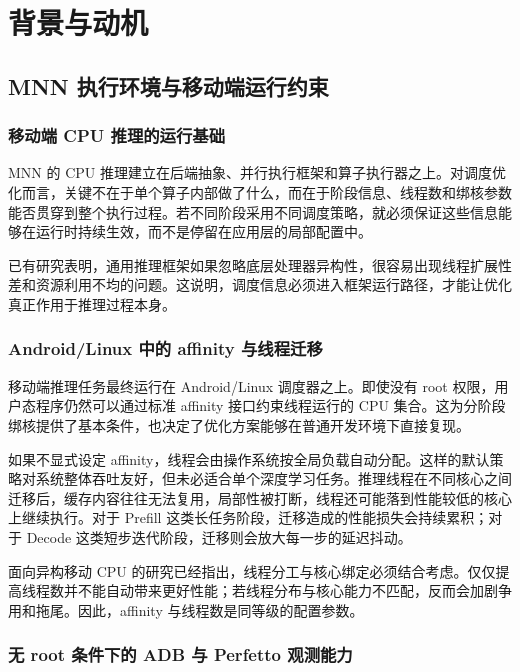 \chapter{背景与动机}

\section{MNN 执行环境与移动端运行约束}

\subsection{移动端 CPU 推理的运行基础}

MNN 的 CPU 推理建立在后端抽象、并行执行框架和算子执行器之上。对调度优化而言，关键不在于单个算子内部做了什么，而在于阶段信息、线程数和绑核参数能否贯穿到整个执行过程。若不同阶段采用不同调度策略，就必须保证这些信息能够在运行时持续生效，而不是停留在应用层的局部配置中。

已有研究表明，通用推理框架如果忽略底层处理器异构性，很容易出现线程扩展性差和资源利用不均的问题\cite{wang2021asymo,xu2021coschedule,kang2020embedded}。这说明，调度信息必须进入框架运行路径，才能让优化真正作用于推理过程本身。

\subsection{Android/Linux 中的 affinity 与线程迁移}

移动端推理任务最终运行在 Android/Linux 调度器之上。即使没有 root 权限，用户态程序仍然可以通过标准 affinity 接口约束线程运行的 CPU 集合。这为分阶段绑核提供了基本条件，也决定了优化方案能够在普通开发环境下直接复现。

如果不显式设定 affinity，线程会由操作系统按全局负载自动分配。这样的默认策略对系统整体吞吐友好，但未必适合单个深度学习任务。推理线程在不同核心之间迁移后，缓存内容往往无法复用，局部性被打断，线程还可能落到性能较低的核心上继续执行。对于 Prefill 这类长任务阶段，迁移造成的性能损失会持续累积；对于 Decode 这类短步迭代阶段，迁移则会放大每一步的延迟抖动。

面向异构移动 CPU 的研究已经指出，线程分工与核心绑定必须结合考虑\cite{wang2021asymo,abdelgawad2022bertperf}。仅仅提高线程数并不能自动带来更好性能；若线程分布与核心能力不匹配，反而会加剧争用和拖尾。因此，affinity 与线程数是同等级的配置参数。

\subsection{无 root 条件下的 ADB 与 Perfetto 观测能力}

